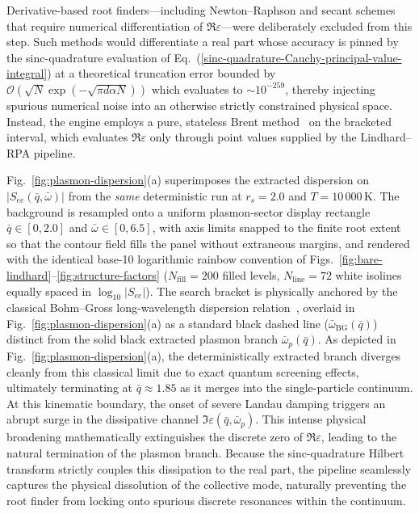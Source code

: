 \documentclass[aps,showkeys,noshowpacs,superscriptaddress,pre,preprint]{revtex4-2}
\begin{document}
Derivative-based root finders---including Newton--Raphson and secant schemes that require
numerical differentiation of $\Re \varepsilon$---were deliberately excluded from this step.
Such methods would differentiate a real part whose accuracy is pinned by the sinc-quadrature
evaluation of Eq.~(\ref{sinc-quadrature-Cauchy-principal-value-integral})
at a theoretical truncation error bounded by $\mathcal{O}(\sqrt{N} \exp(-\sqrt{\pi d \alpha N}))$ which evaluates to $\sim 10^{-259}$, thereby injecting spurious numerical noise
into an otherwise strictly constrained physical space.
Instead, the engine employs a pure, stateless Brent method~\cite{Brent1973} on the bracketed interval,
which evaluates $\Re \varepsilon$ only through point values supplied by the Lindhard--RPA pipeline.

Fig.~\ref{fig:plasmon-dispersion}(a) superimposes the extracted dispersion on $|S_{ee}(\bar{q}, \bar{\omega})|$ from the \emph{same} deterministic run at $r_s = 2.0$ and $T = 10\,000\,\mathrm{K}$.
The background is resampled onto a uniform plasmon-sector display rectangle $\bar{q} \in [0, 2.0]$ and $\bar{\omega} \in [0, 6.5]$, with axis limits snapped to the finite root extent so that the contour field fills the panel without extraneous margins, and rendered with the identical base-10 logarithmic rainbow convention of Figs.~\ref{fig:bare-lindhard}--\ref{fig:structure-factors} ($N_{\mathrm{fill}}=200$ filled levels, $N_{\mathrm{line}}=72$ white isolines equally spaced in $\log_{10}|S_{ee}|$).
The search bracket is physically anchored by the classical Bohm--Gross long-wavelength dispersion relation~\cite{Bohm-Gross1949}, overlaid in Fig.~\ref{fig:plasmon-dispersion}(a) as a standard black dashed line ($\bar{\omega}_{\mathrm{BG}}(\bar{q})$) distinct from the solid black extracted plasmon branch $\bar{\omega}_p(\bar{q})$.
As depicted in Fig.~\ref{fig:plasmon-dispersion}(a), the deterministically extracted branch diverges cleanly from this classical limit due to exact quantum screening effects, ultimately terminating at $\bar{q} \approx 1.85$ as it merges into the single-particle continuum.
At this kinematic boundary, the onset of severe Landau damping triggers an abrupt surge in the dissipative channel $\Im \varepsilon(\bar{q}, \bar{\omega}_p)$.
This intense physical broadening mathematically extinguishes the discrete zero of $\Re \varepsilon$, leading to the natural termination of the plasmon branch.
Because the sinc-quadrature Hilbert transform strictly couples this dissipation to the real part, the pipeline seamlessly captures the physical dissolution of the collective mode, naturally preventing the root finder from locking onto spurious discrete resonances within the continuum.
\end{document}
